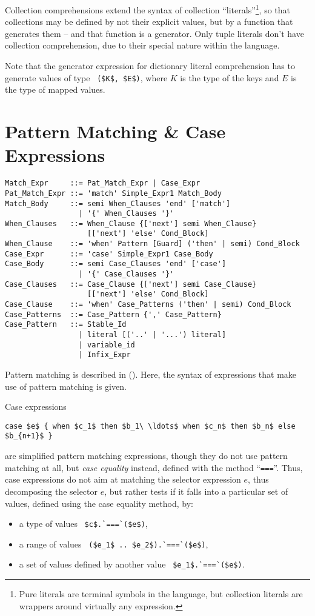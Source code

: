Collection comprehensions extend the syntax of collection ``literals''\footnote{Pure literals are terminal symbols in the language, but collection literals are wrappers around virtually any expression.}, so that collections may be defined by not their explicit values, but by a function that generates them -- and that function is a generator. Only tuple literals don't have collection comprehension, due to their special nature within the language. 

Note that the generator expression for dictionary literal comprehension has to generate values of type ~\lstinline!($K$, $E$)!, where $K$ is the type of the keys and $E$ is the type of mapped values. 






\section{Pattern Matching \& Case Expressions}

\syntax\begin{lstlisting}
Match_Expr     ::= Pat_Match_Expr | Case_Expr
Pat_Match_Expr ::= 'match' Simple_Expr1 Match_Body
Match_Body     ::= semi When_Clauses 'end' ['match']
                 | '{' When_Clauses '}'
When_Clauses   ::= When_Clause {['next'] semi When_Clause} 
                   [['next'] 'else' Cond_Block]
When_Clause    ::= 'when' Pattern [Guard] ('then' | semi) Cond_Block
Case_Expr      ::= 'case' Simple_Expr1 Case_Body
Case_Body      ::= semi Case_Clauses 'end' ['case']
                 | '{' Case_Clauses '}'
Case_Clauses   ::= Case_Clause {['next'] semi Case_Clause}
                   [['next'] 'else' Cond_Block]
Case_Clause    ::= 'when' Case_Patterns ('then' | semi) Cond_Block
Case_Patterns  ::= Case_Pattern {',' Case_Pattern}
Case_Pattern   ::= Stable_Id
                 | literal [('..' | '...') literal]
                 | variable_id
                 | Infix_Expr
\end{lstlisting}

Pattern matching is described in (). Here, the syntax of expressions that make use of pattern matching is given. 

Case expressions 
\begin{lstlisting}
case $e$ { when $c_1$ then $b_1\ \ldots$ when $c_n$ then $b_n$ else $b_{n+1}$ }
\end{lstlisting}
are simplified pattern matching expressions, though they do not use pattern matching at all, but {\em case equality} instead, defined with the method ``\lstinline!===!''. Thus, case expressions do not aim at matching the selector expression $e$, thus decomposing the selector $e$, but rather tests if it falls into a particular set of values, defined using the case equality method, by:
\begin{itemize}
\item a type of values ~\lstinline!$c$.`===`($e$)!,
\item a range of values ~\lstinline!($e_1$ .. $e_2$).`===`($e$)!, 
\item a set of values defined by another value ~\lstinline!$e_1$.`===`($e$)!.
\end{itemize}

